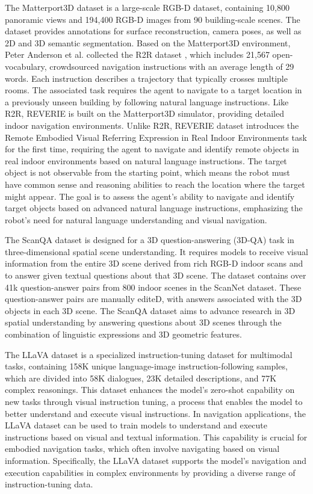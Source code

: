 The Matterport3D dataset \cite{chang2017matterport3d} is a large-scale RGB-D dataset, containing 10,800 panoramic views and 194,400 RGB-D images from 90 building-scale scenes. The dataset provides annotations for surface reconstruction, camera poses, as well as 2D and 3D semantic segmentation. Based on the Matterport3D environment, Peter Anderson et al. collected the R2R dataset \cite{anderson2018vision}, which includes 21,567 open-vocabulary, crowdsourced navigation instructions with an average length of 29 words. Each instruction describes a trajectory that typically crosses multiple rooms. The associated task requires the agent to navigate to a target location in a previously unseen building by following natural language instructions. Like R2R, REVERIE is built on the Matterport3D simulator, providing detailed indoor navigation environments. Unlike R2R, REVERIE dataset \cite{Qi_2020_CVPR} introduces the Remote Embodied Visual Referring Expression in Real Indoor Environments task for the first time, requiring the agent to navigate and identify remote objects in real indoor environments based on natural language instructions. The target object is not observable from the starting point, which means the robot must have common sense and reasoning abilities to reach the location where the target might appear. The goal is to assess the agent's ability to navigate and identify target objects based on advanced natural language instructions, emphasizing the robot's need for natural language understanding and visual navigation.

The ScanQA dataset \cite{Azuma_2022_CVPR} is designed for a 3D question-answering (3D-QA) task in three-dimensional spatial scene understanding. It requires models to receive visual information from the entire 3D scene derived from rich RGB-D indoor scans and to answer given textual questions about that 3D scene. The dataset contains over 41k question-answer pairs from 800 indoor scenes in the ScanNet dataset. These question-answer pairs are manually editeD,  with answers associated with the 3D objects in each 3D scene. The ScanQA dataset aims to advance research in 3D spatial understanding by answering questions about 3D scenes through the combination of linguistic expressions and 3D geometric features.

The LLaVA dataset \cite{liu2024visual} is a specialized instruction-tuning dataset for multimodal tasks, containing 158K unique language-image instruction-following samples, which are divided into 58K dialogues, 23K detailed descriptions, and 77K complex reasonings. This dataset enhances the model's zero-shot capability on new tasks through visual instruction tuning, a process that enables the model to better understand and execute visual instructions. In navigation applications, the LLaVA dataset can be used to train models to understand and execute instructions based on visual and textual information. This capability is crucial for embodied navigation tasks, which often involve navigating based on visual information. Specifically, the LLaVA dataset supports the model's navigation and execution capabilities in complex environments by providing a diverse range of instruction-tuning data.

